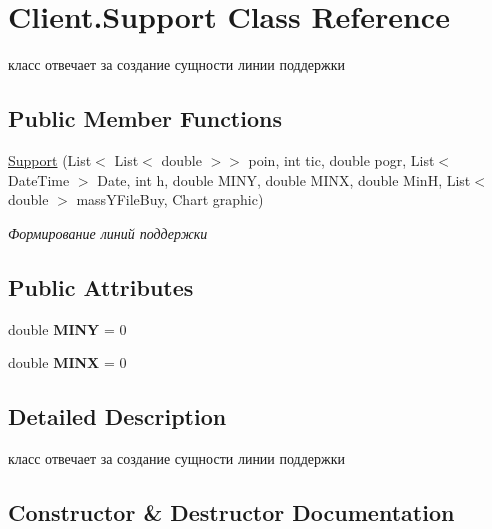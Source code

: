 \hypertarget{class_client_1_1_support}{}\section{Client.\+Support Class Reference}
\label{class_client_1_1_support}


класс отвечает за создание сущности линии поддержки  


\subsection*{Public Member Functions}
\begin{DoxyCompactItemize}
\item 
\hyperlink{class_client_1_1_support_a804e4ee7bda6034926efbb589a81b25c}{Support} (List$<$ List$<$ double $>$$>$ poin, int tic, double pogr, List$<$ Date\+Time $>$ Date, int h, double M\+I\+NY, double M\+I\+NX, double MinH, List$<$ double $>$ mass\+Y\+File\+Buy, Chart graphic)
\begin{DoxyCompactList}\small\item\em Формирование линий поддержки \end{DoxyCompactList}\end{DoxyCompactItemize}
\subsection*{Public Attributes}
\begin{DoxyCompactItemize}
\item 
\hypertarget{class_client_1_1_support_a017d64dcbcac36472cabcd36294966c2}{}\label{class_client_1_1_support_a017d64dcbcac36472cabcd36294966c2} 
double {\bfseries M\+I\+NY} = 0
\item 
\hypertarget{class_client_1_1_support_a59fef07f9629cd08e8b359390465c342}{}\label{class_client_1_1_support_a59fef07f9629cd08e8b359390465c342} 
double {\bfseries M\+I\+NX} = 0
\end{DoxyCompactItemize}


\subsection{Detailed Description}
класс отвечает за создание сущности линии поддержки 



\subsection{Constructor \& Destructor Documentation}
\hypertarget{class_client_1_1_support_a804e4ee7bda6034926efbb589a81b25c}{}\label{class_client_1_1_support_a804e4ee7bda6034926efbb589a81b25c} 
